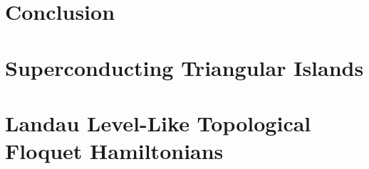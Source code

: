 \documentclass[12pt,doctor]{thesis}
\begin{document}





\chapter{Conclusion}

  

\begin{appendices}

\chapter{Superconducting Triangular Islands}


%

\chapter{Landau Level-Like Topological Floquet Hamiltonians}








\end{appendices}



\end{document}

